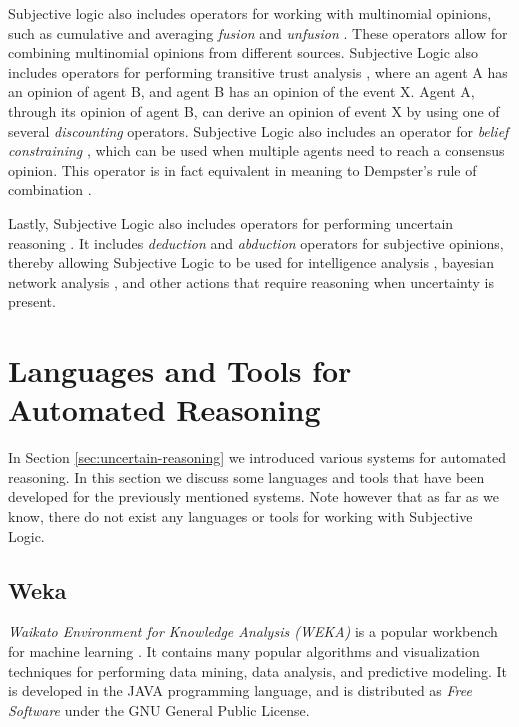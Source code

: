 \documentclass[thesis.tex]{subfiles}
\begin{document}
Subjective logic also includes operators for working with multinomial opinions, such as
cumulative and averaging \emph{fusion} and \emph{unfusion} \cite{josang2010cumulative, josang2009cumulative, josang2009fission, josang2012interpretation}.
These operators allow for combining
multinomial opinions from different sources. Subjective Logic also includes operators for performing
transitive trust analysis \cite{josang2001logic, josang2006trust}, where an agent A has an opinion of agent B, and agent B has an opinion of
the event X. Agent A, through its opinion of agent B, can derive an opinion of event X by using one
of several \emph{discounting} operators. Subjective Logic also includes an operator for
\emph{belief constraining} \cite{josang2012dempster}, which can be used when multiple agents need to reach a consensus opinion.
This operator is in fact equivalent in meaning to Dempster's rule of combination \cite{josang2012dempster}.

Lastly, Subjective Logic also includes operators for performing uncertain reasoning \cite{josanginverting, josang2008conditional, josang2008abductive}.
It includes \emph{deduction} and \emph{abduction} operators for subjective opinions, thereby allowing Subjective
Logic to be used for intelligence analysis \cite{pope2005analysis},
bayesian network analysis \cite{josang2008conditional}, and other actions that
require reasoning when uncertainty is present.




\section{Languages and Tools for Automated Reasoning}
\label{sec:tools-for-reasoning}

In Section \ref{sec:uncertain-reasoning} we introduced various systems for automated reasoning. In this
section we discuss some languages and tools that have been developed for the previously mentioned
systems. Note however that as far as we know, there do not exist any languages or tools for working
with Subjective Logic.





\subsection{Weka}

\emph{Waikato Environment for Knowledge Analysis (WEKA)} is a popular workbench for machine learning
\cite{witten2005data}. It contains many popular algorithms and visualization techniques for performing data mining,
data analysis, and predictive modeling. It is developed in the JAVA programming language, and is
distributed as \emph{Free Software} under the GNU General Public License.
\end{document}

